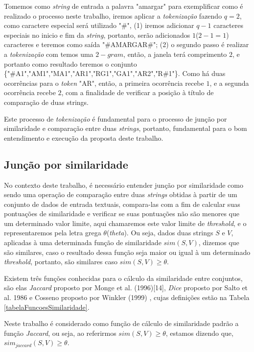Tomemos como \textit{string} de entrada a palavra "amargar" para exemplificar como é realizado o processo neste trabalho, iremos aplicar a \textit{tokenização} fazendo $q=2$, como caractere especial será utilizado "\#", (1) iremos adicionar $q-1$ caracteres especiais no inicio e fim da \textit{string}, portanto, serão adicionados $1$($2-1=1$) caracteres e teremos como saída "\#AMARGAR\#"; (2) o segundo passo é realizar a \textit{tokenização} com temos uma $2-gram$, então, a janela terá comprimento $2$, e portanto como resultado teremos o conjunto \{"\#A1","AM1","MA1","AR1","RG1","GA1","AR2","R\#1"\}. Como há duas ocorrências para o \textit{token} "AR", então, a primeira ocorrência recebe $1$, e a segunda ocorrência recebe $2$, com a finalidade de verificar a posição à título de comparação de duas strings.

Este processo de \textit{tokenização} é fundamental para o processo de junção por similaridade e comparação entre duas \textit{strings}, portanto, fundamental para o bom entendimento e execução da proposta deste trabalho.

\subsection{Junção por similaridade}

No contexto deste trabalho, é necessário entender junção por similaridade como sendo uma operação de comparação entre duas \textit{strings} obtidas à partir de um conjunto de dados de entrada textuais, compara-las com a fim de calcular suas pontuações de similaridade e verificar se suas pontuações não são menores que um determinado valor limite, aqui chamaremos este valor limite de \textit{threshold}, e o representaremos pela letra grega $\theta$(\textit{theta}). Ou seja, dados duas strings $S$ e $V$, aplicadas à uma determinada função de similaridade $sim(S,V)$, dizemos que são similares, caso o resultado dessa função seja maior ou igual à um determinado \textit{threshold}, portanto, são similares caso $sim(S,V) \geq\theta$.

Existem três funções conhecidas para o cálculo da similaridade entre conjuntos, são elas \textit{Jaccard} proposto por Monge et al. (1996)\cite{Monge:1996}[14], \textit{Dice} proposto por Salto et al. 1986\cite{Salton:1986} e Cosseno proposto por Winkler (1999) \cite{Winkler:1999}, cujas definições estão na Tabela \ref{tabelaFuncoesSimilaridade}.



Neste trabalho é considerado como função de cálculo de similaridade padrão a função \textit{Jaccard}, ou seja, ao referirmos $sim(S,V) \geq\theta$, estamos dizendo que, $sim_{jaccard}(S,V) \geq\theta$.

